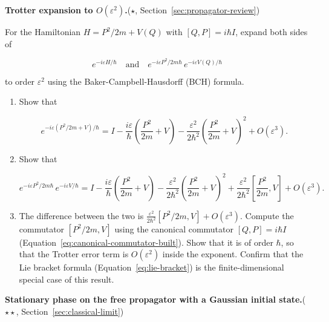 \begin{problemset}
\item[2.] \textbf{Trotter expansion to $O(\varepsilon^2)$.}\quad($\star$, Section~\ref{sec:propagator-review})

For the Hamiltonian $H = P^2/2m + V(Q)$ with $[Q,P] = i\hbar I$, expand both sides of
\begin{linenomath}
\begin{equation}
e^{-i\varepsilon H/\hbar} \quad\text{and}\quad e^{-i\varepsilon P^2/2m\hbar}\,e^{-i\varepsilon V(Q)/\hbar}
\end{equation}
\end{linenomath}
to order $\varepsilon^2$ using the Baker-Campbell-Hausdorff (BCH) formula.

\begin{enumerate}
\item[(a)] Show that
\begin{linenomath}
\begin{equation}
e^{-i\varepsilon(P^2/2m + V)/\hbar} = I - \frac{i\varepsilon}{\hbar}\left(\frac{P^2}{2m}+V\right) - \frac{\varepsilon^2}{2\hbar^2}\left(\frac{P^2}{2m}+V\right)^2 + O(\varepsilon^3).
\end{equation}
\end{linenomath}
\item[(b)] Show that
\begin{linenomath}
\begin{equation}
e^{-i\varepsilon P^2/2m\hbar}\,e^{-i\varepsilon V/\hbar} = I - \frac{i\varepsilon}{\hbar}\left(\frac{P^2}{2m}+V\right) - \frac{\varepsilon^2}{2\hbar^2}\left(\frac{P^2}{2m}+V\right)^2 + \frac{\varepsilon^2}{2\hbar^2}\left[\frac{P^2}{2m},V\right] + O(\varepsilon^3).
\end{equation}
\end{linenomath}
\item[(c)] The difference between the two is $\frac{\varepsilon^2}{2\hbar^2}[P^2/2m, V] + O(\varepsilon^3)$. Compute the commutator $[P^2/2m, V]$ using the canonical commutator $[Q,P] = i\hbar I$ (Equation~\eqref{eq:canonical-commutator-built}). Show that it is of order $\hbar$, so that the Trotter error term is $O(\varepsilon^2)$ inside the exponent. Confirm that the Lie bracket formula (Equation~\eqref{eq:lie-bracket}) is the finite-dimensional special case of this result.
\end{enumerate}

\item[3.] \textbf{Stationary phase on the free propagator with a Gaussian initial state.}\quad($\star\star$, Section~\ref{sec:classical-limit})


\end{problemset}
